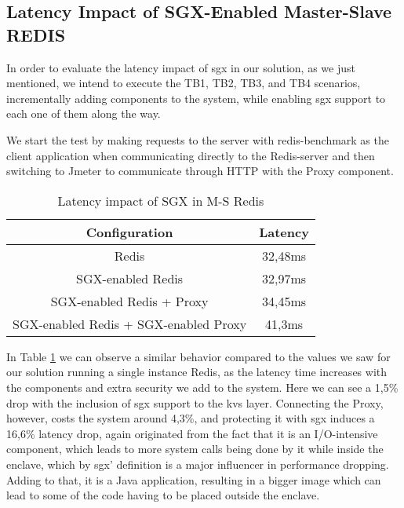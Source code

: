 \subsection{Latency Impact of SGX-Enabled Master-Slave REDIS}

In order to evaluate the latency impact of \gls{sgx} in our solution, as we just mentioned, we intend to execute the TB1, TB2, TB3, and TB4 scenarios, incrementally adding components to the system, while enabling \gls{sgx} support to each one of them along the way. 

We start the test by making requests to the server with redis-benchmark as the client application when communicating directly to the Redis-server and then switching to Jmeter to communicate through HTTP with the Proxy component.

\begin{table}[ht]
	\caption{Latency impact of SGX in M-S Redis} %
	\centering %
	\begin{tabular}{c c} %
		\hline\hline %
		\textbf{Configuration} & \textbf{Latency} \\ [0.5ex] %
		\hline
		Redis & 32,48ms\\
		\hline
		SGX-enabled Redis & 32,97ms \\
		\hline
		SGX-enabled Redis + Proxy & 34,45ms \\
		\hline %
		SGX-enabled Redis + SGX-enabled Proxy & 41,3ms\\ [1ex] %
		\hline %
	\end{tabular}
	\label{table:latencyMasterSlaveRedis} %
\end{table}

In Table \ref{table:latencyMasterSlaveRedis} we can observe a similar behavior compared to the values we saw for our solution running a single instance Redis, as the latency time increases with the components and extra security we add to the system. Here we can see a 1,5\% drop with the inclusion of \gls{sgx} support to the \gls{kvs} layer. Connecting the Proxy, however, costs the system around 4,3\%, and protecting it with \gls{sgx} induces a 16,6\% latency drop, again originated from the fact that it is an I/O-intensive component, which leads to more system calls being done by it while inside the enclave, which by \gls{sgx}' definition is a major influencer in performance dropping. Adding to that, it is a Java application, resulting in a bigger image which can lead to some of the code having to be placed outside the enclave.

